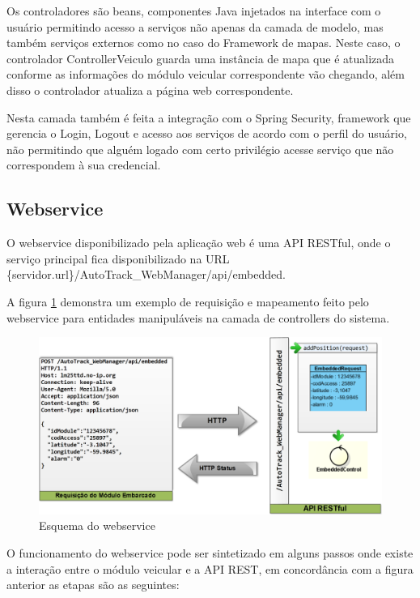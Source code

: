 Os controladores são beans, componentes Java injetados na interface com o usuário permitindo acesso a serviços não apenas da camada de modelo, mas também serviços externos como no caso do Framework de mapas. Neste caso, o controlador ControllerVeiculo guarda uma instância de mapa que é atualizada conforme as informações do módulo veicular correspondente vão chegando, além disso o controlador atualiza a página web correspondente.

Nesta camada também é feita a integração com o Spring Security, framework que gerencia o Login, Logout e acesso aos serviços de acordo com o perfil do usuário, não permitindo que alguém logado com certo privilégio acesse serviço que não correspondem à sua credencial.


\subsection {Webservice}

O webservice disponibilizado pela aplicação web é uma API RESTful, onde o serviço principal fica disponibilizado na URL \{servidor.url\}/AutoTrack\_WebManager/api/embedded. 

A figura \ref{fig:webmanwebservice} demonstra um exemplo de requisição e mapeamento feito pelo webservice para entidades manipuláveis na camada de controllers do sistema.

\begin{figure}[!htb]
	\centering
	\includegraphics[width=\textwidth]{figures/RESTMapp.png}
	\caption{Esquema do webservice}
	\label{fig:webmanwebservice}
\end{figure}

O funcionamento do webservice pode ser sintetizado em alguns passos onde existe a interação entre o módulo veicular e a API REST, em concordância com a figura anterior as etapas são as seguintes: 

